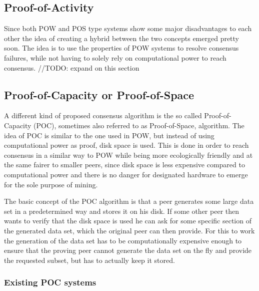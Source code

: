 \subsection{Proof-of-Activity} \label{poa}

Since both POW and POS type systems show some major disadvantages to each other the idea of creating a hybrid between the two concepts emerged pretty soon. The idea is to use the properties of POW
systems to resolve consensus failures, while not having to solely rely on computational power to reach consensus.
//TODO: expand on this section

\subsection{Proof-of-Capacity or Proof-of-Space}

\label{proof-of-space}

A different kind of proposed consensus algorithm is the so called Proof-of-Capacity (POC), sometimes also referred to as Proof-of-Space, algorithm. The idea of POC is similar to the one used in POW, but
instead of using computational power as proof, disk space is used. This is done in order to reach consensus in a similar way to POW while being more ecologically friendly and at the same
fairer to smaller peers, since disk space is less expensive compared to computational power and there is no danger for designated hardware to emerge for the sole purpose of mining.\par
The basic concept of the POC algorithm is that a peer generates some large data set in a predetermined way and stores it on his disk. If some other peer then wants to verify that the disk space is used
he can ask for some specific section of the generated data set, which the original peer can then provide. For this to work the generation of the data set has to be computationally expensive enough
to ensure that the proving peer cannot generate the data set on the fly and provide the requested subset, but has to actually keep it stored.\cite{url:poc}

\subsubsection{Existing POC systems}

